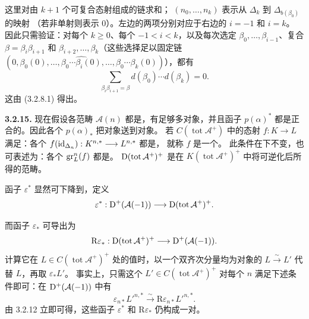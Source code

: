 这里对由 $k+1$ 个可复合态射组成的链求和；
$(n_0,\ldots,n_k)$ 表示从 $\Delta_k$ 到 $\Delta_{b(\beta_0)}$ 的映射
（若非单射则表示 $0$）。左边的两项分别对应于右边的 $i=-1$ 和 $i=k$。
因此只需验证：对每个 $k\geq0$、每个 $-1<i<k$，以及每次选定
$\beta_0,\ldots,\beta_{i-1}$、复合 $\beta=\beta_i\beta_{i+1}$ 和
$\beta_{i+2},\ldots,\beta_k$（这些选择足以固定链
$(0,\beta_0(0),\ldots,\widehat{\beta_0\cdots\beta_i(0)},
\ldots,\beta_0\cdots\beta_k(0))$），都有
\[
\sum_{\beta_i\beta_{i+1}=\beta}d(\beta_0)\cdots d(\beta_k)=0.
\]
这由 (3.2.8.1) 得出。

\par\medskip\noindent\textbf{3.2.15.}
现在假设各范畴 $\mathcal A(n)$ 都是，有足够多对象，并且函子
$p(\alpha)^*$ 都是正合的。因此各个 $p(\alpha)_*$ 把对象送到对象。
若 $C(\operatorname{tot}\mathcal A^+)$ 中的态射
$f:K\longrightarrow L$ 满足：各个
$f(\operatorname{id}_{\Delta_n}):K^{n,*}\longrightarrow L^{n,*}$ 都是，
就称 $f$ 是一个\emph{}。
此条件在下不变，也可表述为：各个 $\operatorname{gr}_L^n(f)$ 都是。
 $\mathrm{D}(\operatorname{tot}\mathcal A^+)^+$ 是在
$K(\operatorname{tot}\mathcal A^+)^+$ 中将可逆化后所得的范畴。

函子 $\varepsilon^*$ 显然可下降到，定义
\[
\varepsilon^*:\mathrm{D}^+(\mathcal A(-1))\longrightarrow
\mathrm{D}(\operatorname{tot}\mathcal A^+)^+.
\]

而函子 $\varepsilon_*$ 可导出为
\[
\mathrm R\varepsilon_*:\mathrm{D}(\operatorname{tot}\mathcal A^+)^+
 \longrightarrow\mathrm{D}^+(\mathcal A(-1)).
\]
计算它在 $L\in C(\operatorname{tot}\mathcal A^+)^+$ 处的值时，以一个双齐次分量均为对象的
$L\xrightarrow{\sim}L'$ 代替 $L$，再取 $\varepsilon_*L'$。
事实上，只需这个 $L'\in C(\operatorname{tot}\mathcal A^+)^+$
对每个 $n$ 满足下述条件即可：在 $\mathrm{D}^+(\mathcal A(-1))$ 中有
\[
\varepsilon_{n*}L'^{n,*}\xrightarrow{\sim}
\mathrm R\varepsilon_{n*}L'^{n,*}.
\]
由 3.2.12 立即可得，这些函子 $\varepsilon^*$ 和
$\mathrm R\varepsilon_*$ 仍构成一对。

